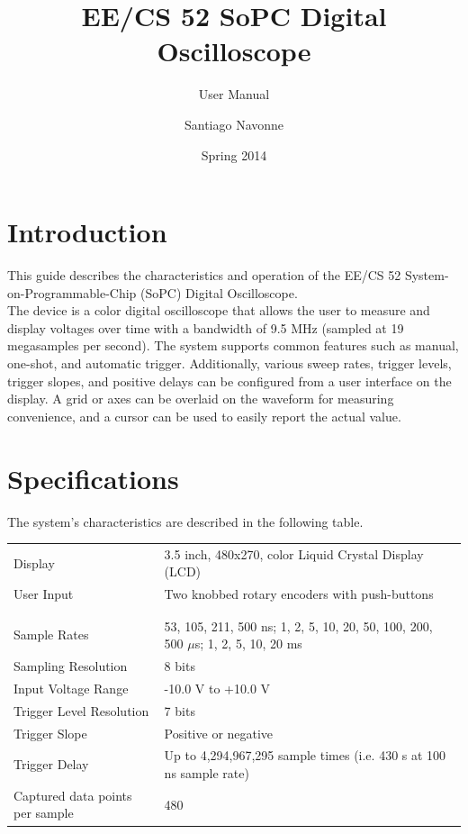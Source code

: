 \documentclass{scrartcl}
\begin{document}

\pagestyle{plain}

	\title{EE/CS 52 SoPC Digital Oscilloscope}
	\subtitle{User Manual}
	\author{Santiago Navonne} 
	\date{Spring 2014} 
	\maketitle

	
	\section{Introduction}
	This guide describes the characteristics and operation of the EE/CS 52 System-on-Programmable-Chip (SoPC) Digital Oscilloscope.\\
	
	The device is a color digital oscilloscope that allows the user to measure and display voltages over time with a bandwidth of 9.5 MHz (sampled at 19 megasamples per second). The system supports common features such as manual, one-shot, and automatic trigger. Additionally, various sweep rates, trigger levels, trigger slopes, and positive delays can be configured from a user interface on the display. A grid or axes can be overlaid on the waveform for measuring convenience, and a cursor can be used to easily report the actual value.
	
	\section{Specifications}
	The system's characteristics are described in the following table.

	\begin{center}
    		\begin{tabular}{ p{5cm} p{10cm} }
		Display & 3.5 inch, 480x270, color Liquid Crystal Display (LCD) \\
		User Input & Two knobbed rotary encoders with push-buttons \\
		\\ \hline \\
		Sample Rates & 53, 105, 211, 500 ns; 1, 2, 5, 10, 20, 50, 100, 200, 500 $\mu$s; 1, 2, 5, 10, 20 ms \\
		Sampling Resolution & 8 bits \\
		Input Voltage Range & -10.0 V to +10.0 V \\
		Trigger Level Resolution & 7 bits \\
		Trigger Slope & Positive or negative \\
		Trigger Delay & Up to 4,294,967,295 sample times (i.e. 430 s at 100 ns sample rate) \\
		Captured data points per sample & 480
		\end{tabular}
	\end{center}
		
\end{document}
